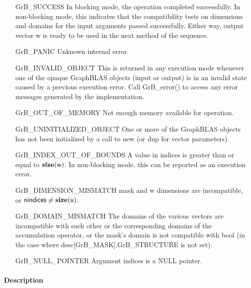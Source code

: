 \begin{itemize}[leftmargin=2.3in]
    \item[{\sf GrB\_SUCCESS}]         In blocking mode, the operation completed
    successfully. In non-blocking mode, this indicates that the compatibility 
    tests on dimensions and domains for the input arguments passed successfully. 
    Either way, output vector {\sf w} is ready to be used in the next method of
    the sequence.

    \item[{\sf GrB\_PANIC}]           Unknown internal error.

    \item[{\sf GrB\_INVALID\_OBJECT}] This is returned in any execution mode 
    whenever one of the opaque GraphBLAS objects (input or output) is in an invalid 
    state caused by a previous execution error.  Call {\sf GrB\_error()} to access 
    any error messages generated by the implementation.

    \item[{\sf GrB\_OUT\_OF\_MEMORY}] Not enough memory available for operation.

    \item[{\sf GrB\_UNINITIALIZED\_OBJECT}] One or more of the GraphBLAS objects
    has not been initialized by a call to {\sf new} (or {\sf dup} for vector
    parameters).

    \item[{\sf GrB\_INDEX\_OUT\_OF\_BOUNDS}]  A value in {\sf indices} is greater
    than or equal to $\bold{size}({\sf w})$.  In non-blocking mode, this can be
    reported as an execution error.

    \item[{\sf GrB\_DIMENSION\_MISMATCH}] {\sf mask} and {\sf w} dimensions are
    incompatible, or ${\sf nindices} \neq \bold{size}({\sf u})$. 

    \item[{\sf GrB\_DOMAIN\_MISMATCH}]    The domains of the various vectors are
    incompatible with each other or the corresponding domains of the
    accumulation operator, or the mask's domain is not compatible with {\sf bool}
    (in the case where {\sf desc[GrB\_MASK].GrB\_STRUCTURE} is not set).

    \item[{\sf GrB\_NULL\_POINTER}] Argument {\sf indices} is a {\sf NULL} pointer.
\end{itemize}

\paragraph{Description}

